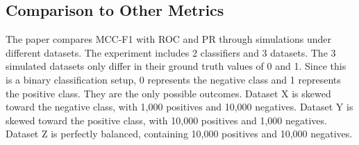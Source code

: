 \documentclass[12pt, oneside]{amsart}
\theoremstyle{definition}
\theoremstyle{remark}
\numberwithin{equation}{section}
\begin{document}
\subsection{Comparison to Other Metrics}
The paper compares MCC-F1 with ROC and PR through simulations under different datasets. The experiment includes 2 classifiers and 3 datasets.  The 3 simulated datasets only differ in their ground truth values of 0 and 1. Since this is a binary classification setup, 0 represents the negative class and 1 represents the positive class. They are the only possible outcomes. Dataset X is skewed toward the negative class, with 1,000 positives and 10,000 negatives. Dataset Y is skewed toward the positive class, with 10,000 positives and 1,000 negatives. Dataset Z is perfectly balanced, containing 10,000 positives and 10,000 negatives. \\
\end{document}

